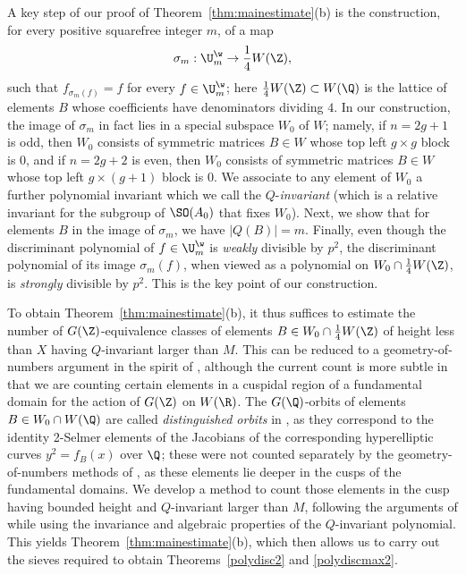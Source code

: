 A key step of our proof of Theorem~\ref{thm:mainestimate}(b) is the
construction, for every positive squarefree integer $m$, of a map
\begin{equation*}
\sigma_m:\U_m^\w\to \frac14W(\Z),
\end{equation*}
such that $f_{\sigma_m(f)}=f$ for every $f\in \U_m^\w$; here
$\frac14W(\Z)\subset W(\Q)$ is the lattice of elements $B$ whose
coefficients have denominators dividing $4$.  In our construction, the
image of $\sigma_m$ in fact lies in a special subspace $W_0$ of $W$;
namely, if $n=2g+1$ is odd, then $W_0$ consists of symmetric matrices
$B\in W$ whose top left $g\times g$ block is 0, and if $n=2g+2$ is
even, then $W_0$ consists of symmetric matrices $B\in W$ whose top
left $g\times (g+1)$ block is 0. We associate to any element of $W_0$
a further polynomial invariant which we call the $Q$-{\it invariant}
(which is a relative invariant for the subgroup of $\SO(A_0)$ that
fixes $W_0$).
Next, we show that for elements $B$ in the image of $\sigma_m$, we
have $|Q(B)|=m$.
Finally, {even though the discriminant polynomial of $f\in\U_m^\w$ is
  {\it weakly} divisible by $p^2$, the discriminant polynomial of its
  image $\sigma_m(f)$, when viewed as a polynomial on $W_0\cap
  \frac14W(\Z)$, is {\it strongly} divisible by $p^2$.}  This is the
key point of our construction.

To obtain Theorem~\ref{thm:mainestimate}(b), it thus suffices to
estimate the number of $G(\Z)$-equivalence classes of elements $B\in
W_0\cap \frac14W(\Z)$ of height less than $X$ having $Q$-invariant
larger than $M$.  This can be reduced to a geometry-of-numbers
argument in the spirit of \cite{BG2,SW}, although the current count is
more subtle in that we are counting certain elements in a cuspidal
region of a fundamental domain for the action of $G(\Z)$ on $W(\R)$.
The $G(\Q)$-orbits of elements $B\in W_0\cap W(\Q)$ are called {\it
  distinguished orbits} in \cite{BG2,SW}, as they correspond to the
identity 2-Selmer elements of the Jacobians of the corresponding
hyperelliptic curves $y^2=f_B(x)$ over $\Q$; these were not counted
separately by the geometry-of-numbers methods of \cite{BG2,SW}, as
these elements lie deeper in the cusps of the fundamental domains.  We
develop a method to count those elements in the cusp having bounded height and $Q$-invariant larger than $M$, following
the arguments of \cite{BG2,SW} while using the invariance and
algebraic properties of the $Q$-invariant polynomial.  This yields
Theorem~\ref{thm:mainestimate}(b), which then allows us to carry out
the sieves required to obtain Theorems~\ref{polydisc2} and
\ref{polydiscmax2}.

